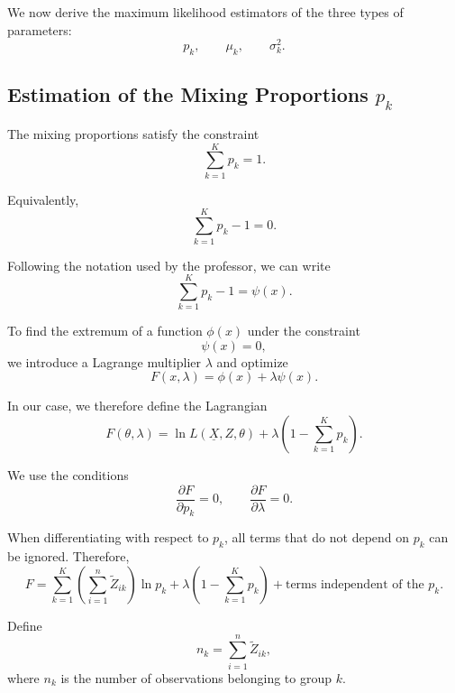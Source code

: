 We now derive the maximum likelihood estimators of the three types
of parameters:
\begin{equation*}
p_k,\qquad \mu_k,\qquad \sigma_k^2.
\end{equation*}

\subsection{Estimation of the Mixing Proportions $p_k$}

The mixing proportions satisfy the constraint
\begin{equation*}
\sum_{k=1}^Kp_k=1.
\end{equation*}

Equivalently,
\begin{equation*}
\sum_{k=1}^Kp_k-1=0.
\end{equation*}

Following the notation used by the professor, we can write
\begin{equation*}
\sum_{k=1}^Kp_k-1=\psi(x).
\end{equation*}

To find the extremum of a function $\phi(x)$ under the constraint
\begin{equation*}
\psi(x)=0,
\end{equation*}
we introduce a Lagrange multiplier $\lambda$ and optimize
\begin{equation*}
F(x,\lambda)
=
\phi(x)+\lambda\psi(x).
\end{equation*}

In our case, we therefore define the Lagrangian
\begin{equation*}
F(\theta,\lambda)
=
\ln L(\underline{X},Z,\theta)
+
\lambda
\left(
1-\sum_{k=1}^Kp_k
\right).
\end{equation*}

We use the conditions
\begin{equation*}
\frac{\partial F}{\partial p_k}=0,
\qquad
\frac{\partial F}{\partial\lambda}=0.
\end{equation*}

When differentiating with respect to $p_k$, all terms that do not
depend on $p_k$ can be ignored. Therefore,
\begin{equation*}
F
=
\sum_{k=1}^K
\left(
\sum_{i=1}^n\tilde{Z}_{ik}
\right)\ln p_k
+
\lambda
\left(
1-\sum_{k=1}^Kp_k
\right)
+
\text{terms independent of the }p_k.
\end{equation*}

Define
\begin{equation*}
n_k
=
\sum_{i=1}^n\tilde{Z}_{ik},
\end{equation*}
where $n_k$ is the number of observations belonging to group $k$.

